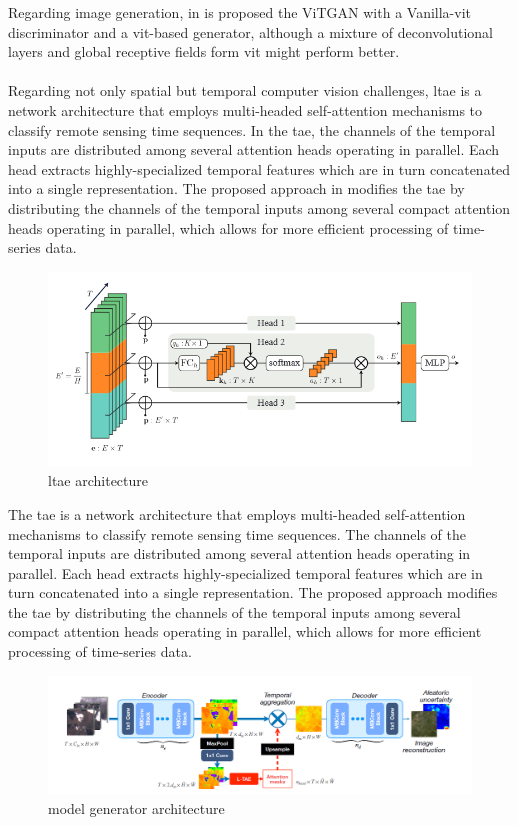 \documentclass[11pt, a4paper]{article}
\begin{document}
	Regarding image generation, in is proposed the ViTGAN with a Vanilla-\gls{vit} discriminator and a \gls{vit}-based generator, although a mixture of deconvolutional layers and global receptive fields form \gls{vit} might perform better.
	\\\\
	Regarding not only spatial but temporal computer vision challenges, \gls{ltae} is a network architecture that employs multi-headed self-attention mechanisms to classify remote sensing time sequences. In the \gls{tae}, the channels of the temporal inputs are distributed among several attention heads operating in parallel. Each head extracts highly-specialized temporal features which are in turn concatenated into a single representation. The proposed approach in \cite{garnot2021lightweight} modifies the \gls{tae} by distributing the channels of the temporal inputs among several compact attention heads operating in parallel, which allows for more efficient processing of time-series data.
	\begin{figure}[H]
		\centering
		\includegraphics[width=12cm]{imgs/relatedwork/ltae}
		\caption{\gls{ltae} architecture}
	\end{figure}
	The  \gls{tae} is a network architecture that employs multi-headed self-attention mechanisms to classify remote sensing time sequences. The channels of the temporal inputs are distributed among several attention heads operating in parallel. Each head extracts highly-specialized temporal features which are in turn concatenated into a single representation. The proposed approach modifies the \gls{tae} by distributing the channels of the temporal inputs among several compact attention heads operating in parallel, which allows for more efficient processing of time-series data. 
	\begin{figure}[H]
		\centering
		\includegraphics[width=15cm]{imgs/relatedwork/uncertainty}
		\caption{\cite{uncrtaints2021ebel} model generator architecture}
	\end{figure}
\end{document}
